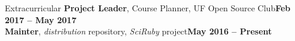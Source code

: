 \begin{rSection}{Extracurricular} \itemsep -2pt
{\textbf{Project Leader}, Course Planner, UF Open Source Club}\hfill {\bfseries Feb 2017 -- May 2017} \\
{\textbf{Mainter}, \textit{distribution} repository, \textit{SciRuby} project}\hfill {\bfseries May 2016 -- Present} \\
\end{rSection}